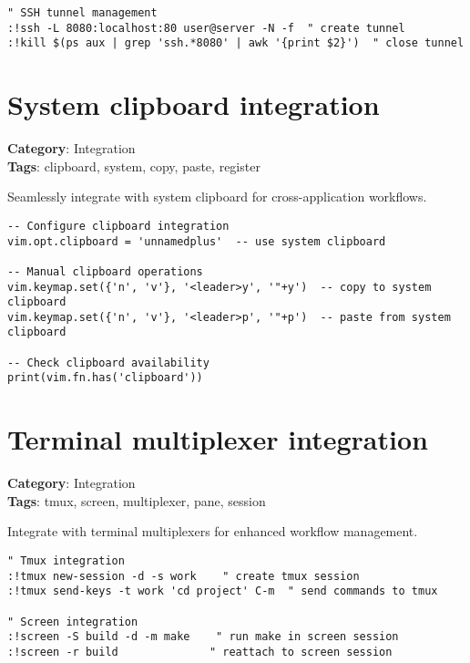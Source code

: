 {{{{{{\begin{Exa*}{}
\begin{Verbatim}[fontsize=\footnotesize, breaklines, breakanywhere]
" SSH tunnel management
:!ssh -L 8080:localhost:80 user@server -N -f  " create tunnel
:!kill $(ps aux | grep 'ssh.*8080' | awk '{print $2}')  " close tunnel
\end{Verbatim}
\end{Exa*}

\section{System clipboard integration}

\textbf{Category}: Integration\\ \textbf{Tags}: clipboard, system, copy, paste, register
\vspace{0.5cm}

Seamlessly integrate with system clipboard for cross-application workflows.

\begin{Exa*}{}
\begin{Verbatim}[fontsize=\footnotesize, breaklines, breakanywhere]
-- Configure clipboard integration
vim.opt.clipboard = 'unnamedplus'  -- use system clipboard

-- Manual clipboard operations
vim.keymap.set({'n', 'v'}, '<leader>y', '"+y')  -- copy to system clipboard
vim.keymap.set({'n', 'v'}, '<leader>p', '"+p')  -- paste from system clipboard

-- Check clipboard availability
print(vim.fn.has('clipboard'))
\end{Verbatim}
\end{Exa*}

\section{Terminal multiplexer integration}

\textbf{Category}: Integration\\ \textbf{Tags}: tmux, screen, multiplexer, pane, session
\vspace{0.5cm}

Integrate with terminal multiplexers for enhanced workflow management.

\begin{Exa*}{}
\begin{Verbatim}[fontsize=\footnotesize, breaklines, breakanywhere]
" Tmux integration
:!tmux new-session -d -s work    " create tmux session
:!tmux send-keys -t work 'cd project' C-m  " send commands to tmux

" Screen integration  
:!screen -S build -d -m make    " run make in screen session
:!screen -r build              " reattach to screen session


\end{Verbatim}
\end{Exa*}}}}}}}
